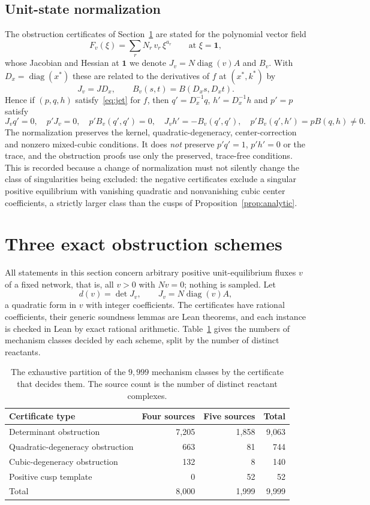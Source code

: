 \documentclass[11pt,a4paper]{article}
\theoremstyle{plain}
\theoremstyle{definition}
\theoremstyle{remark}
\numberwithin{equation}{section}
\newcommand{\one}{\mathbf{1}}
\newcommand{\Diag}{\operatorname{diag}}
\begin{document}
\subsection{Unit-state normalization}\label{sec:normalization}
The obstruction certificates of Section~\ref{sec:negative} are stated for the polynomial vector field
\[
 F_v(\xi)=\sum_r N_r\,v_r\,\xi^{a_r}\qquad\text{at }\xi=\one,
\]
whose Jacobian and Hessian at $\one$ we denote $J_v=N\Diag(v)A$ and $B_v$. With $D_x=\Diag(x^*)$ these are related to the derivatives of $f$ at $(x^*,k^*)$ by
\[
 J_v=JD_x,\qquad B_v(s,t)=B(D_xs,D_xt).
\]
Hence if $(p,q,h)$ satisfy~\eqref{eq:jet} for $f$, then $q'=D_x^{-1}q$, $h'=D_x^{-1}h$ and $p'=p$ satisfy
\[
 J_vq'=0,\quad p'J_v=0,\quad p'B_v(q',q')=0,\quad J_vh'=-B_v(q',q'),\quad p'B_v(q',h')=pB(q,h)\ne0 .
\]
The normalization preserves the kernel, quadratic-degeneracy, center-correction and nonzero mixed-cubic conditions. It does \emph{not} preserve $p'q'=1$, $p'h'=0$ or the trace, and the obstruction proofs use only the preserved, trace-free conditions. This is recorded because a change of normalization must not silently change the class of singularities being excluded: the negative certificates exclude a singular positive equilibrium with vanishing quadratic and nonvanishing cubic center coefficients, a strictly larger class than the cusps of Proposition~\ref{prop:analytic}.

\section{Three exact obstruction schemes}\label{sec:negative}

All statements in this section concern arbitrary positive unit-equilibrium fluxes $v$ of a fixed network, that is, all $v>0$ with $Nv=0$; nothing is sampled. Let
\[
 d(v)=\det J_v,\qquad J_v=N\Diag(v)A,
\]
a quadratic form in $v$ with integer coefficients. The certificates have rational coefficients, their generic soundness lemmas are Lean theorems, and each instance is checked in Lean by exact rational arithmetic. Table~\ref{tab:counts} gives the numbers of mechanism classes decided by each scheme, split by the number of distinct reactants.

\begin{table}[tb]
\centering
\caption{The exhaustive partition of the $9{,}999$ mechanism classes by the certificate that decides them. The source count is the number of distinct reactant complexes.}
\label{tab:counts}
\begin{tabular}{lrrr}\toprule
Certificate type & Four sources & Five sources & Total\\\midrule
Determinant obstruction & 7,205 & 1,858 & 9,063\\
Quadratic-degeneracy obstruction & 663 & 81 & 744\\
Cubic-degeneracy obstruction & 132 & 8 & 140\\
Positive cusp template & 0 & 52 & 52\\\midrule
Total & 8,000 & 1,999 & 9,999\\\bottomrule
\end{tabular}
\end{table}
\end{document}
